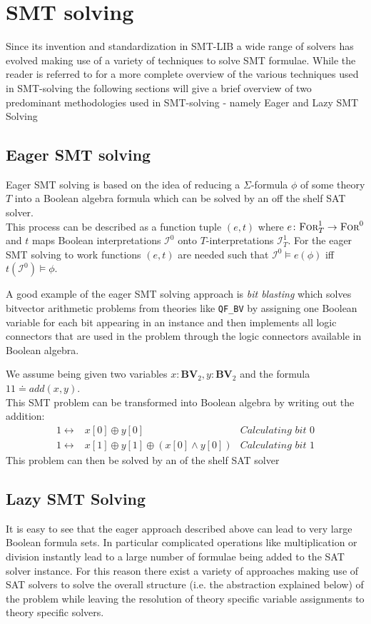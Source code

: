 \section{SMT solving}
Since its invention and standardization in SMT-LIB \cite{BarFT-SMTLIB} a wide range of solvers has evolved making use of a variety of techniques to solve SMT formulae. While the reader is referred to \cite{Barrett-Tinelli-SMT} for a more complete overview of the various techniques used in SMT-solving the following sections will give a brief overview of two predominant methodologies used in SMT-solving - namely Eager and Lazy SMT Solving 
\subsection{Eager SMT solving}
Eager SMT solving is based on the idea of reducing a $\Sigma$-formula $\phi$ of some theory $T$ into a Boolean algebra formula which can be solved by an off the shelf SAT solver.\\
This process can be described as a function tuple $(e,t)$ where $e\colon\textsc{For}^1_T\to\textsc{For}^0$ and $t$ maps Boolean interpretations $\mathcal{I}^0$ onto $T$-interpretations $\mathcal{I}^1_T$. For the eager SMT solving to work functions $(e,t)$ are needed such that $\mathcal{I}^0\vDash e\left(\phi\right)$ iff $t\left(\mathcal{I}^0\right)\vDash\phi$.
\par
A good example of the eager SMT solving approach is \textit{bit blasting} which solves bitvector arithmetic problems from theories like \texttt{QF\_BV} by assigning one Boolean variable for each bit appearing in an instance and then implements all logic connectors that are used in the problem through the logic connectors available in Boolean algebra.
\begin{example}[Addition]
We assume being given two variables $x\colon\mathbf{BV}_2, y\colon\mathbf{BV}_2$ and the formula $11\doteq add\left(x,y\right)$.\\
This SMT problem can be transformed into Boolean algebra by writing out the addition:
\begin{align*}
1 \leftrightarrow & x[0] \oplus y[0] & \textit{Calculating bit 0}\\
1 \leftrightarrow & x[1] \oplus y[1] \oplus \left(x[0] \land y[0] \right) & \textit{Calculating bit 1}
\end{align*}
This problem can then be solved by an of the shelf SAT solver
\end{example}

\subsection{Lazy SMT Solving}
It is easy to see that the eager approach described above can lead to very large Boolean formula sets. In particular complicated operations like multiplication or division instantly lead to a large number of formulae being added to the SAT solver instance. For this reason there exist a variety of approaches making use of SAT solvers to solve the overall structure (i.e. the abstraction explained below) of the problem while leaving the resolution of theory specific variable assignments to theory specific solvers.

